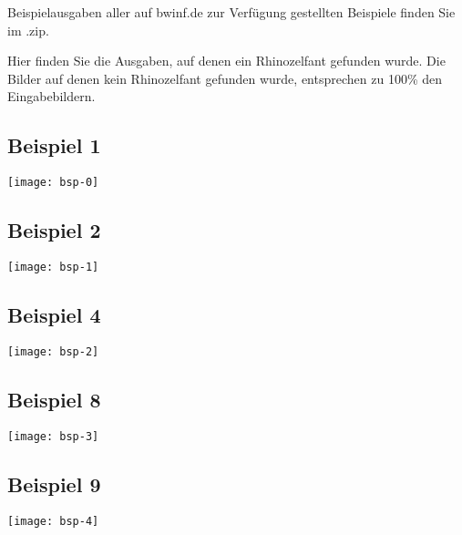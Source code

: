 Beispielausgaben aller auf bwinf.de zur Verfügung gestellten Beispiele finden Sie im .zip.

Hier finden Sie die Ausgaben, auf denen ein Rhinozelfant gefunden wurde. Die Bilder auf denen kein Rhinozelfant gefunden wurde, entsprechen zu 100\% den Eingabebildern.

\subsection{Beispiel 1}
	\centering
	\texttt{[image: bsp-0]}
\subsection{Beispiel 2}
	\centering
	\texttt{[image: bsp-1]}
\subsection{Beispiel 4}
	\centering
	\texttt{[image: bsp-2]}
\subsection{Beispiel 8}
	\centering
	\texttt{[image: bsp-3]}
\subsection{Beispiel 9}
	\centering
	\texttt{[image: bsp-4]}